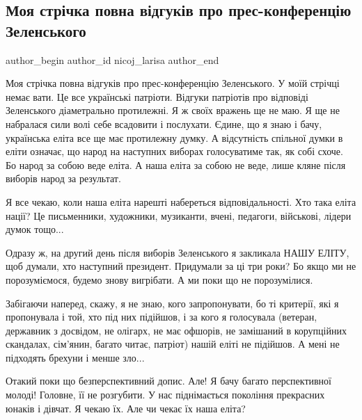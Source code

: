  
 
 
 
 
 
\subsection{Моя стрічка повна відгуків про прес-конференцію Зеленського}
\label{sec:26_11_2021.fb.nicoj_larisa.1.zelenskii_press_konferencia}
 
\ifcmt
 author_begin
   author_id nicoj_larisa
 author_end
\fi

Моя стрічка повна відгуків про прес-конференцію Зеленського. У моїй стрічці
немає вати. Це все українські патріоти. Відгуки патріотів про відповіді
Зеленського діаметрально протилежні. Я ж своїх вражень ще не маю. Я ще не
набралася сили волі себе всадовити і послухати. Єдине, що я знаю і бачу,
українська еліта все ще має протилежну думку. А відсутність спільної думки в
еліти означає, що народ на наступних виборах голосуватиме так, як собі схоче.
Бо народ за собою веде еліта. А наша еліта за собою не веде, лише кляне після
виборів народ за результат.

Я все чекаю, коли наша еліта нарешті набереться відповідальності. Хто така
еліта нації? Це письменники, художники, музиканти, вчені, педагоги, військові,
лідери думок тощо...

Одразу ж, на другий день після виборів Зеленського я закликала НАШУ ЕЛІТУ, щоб
думали, хто наступний президент. Придумали за ці три роки? Бо якщо ми не
порозуміємося, будемо знову вигрібати. А ми поки що не порозумілися.

Забігаючи наперед, скажу, я не знаю, кого запропонувати, бо ті критерії, які я
пропонувала і той, хто під них підійшов, і за кого я голосувала (ветеран,
державник з досвідом, не олігарх, не має офшорів, не замішаний в корупційних
скандалах, сім'янин, багато читає, патріот) нашій еліті не підійшов. А мені не
підходять брехуни і менше зло... 

Отакий поки що безперспективний допис. Але! Я бачу багато перспективної молоді!
Головне, її не розгубити. У нас піднімається покоління прекрасних юнаків і
дівчат. Я чекаю їх. Але чи чекає їх наша еліта?


